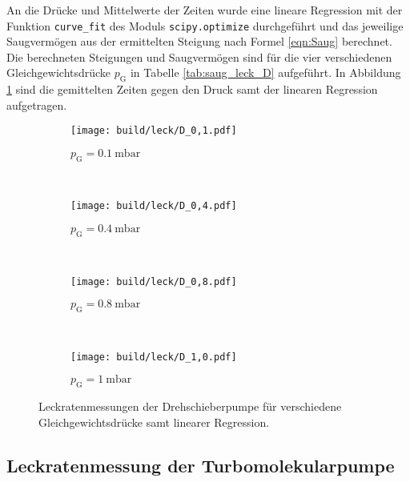 



\FloatBarrier

An die Drücke und Mittelwerte der Zeiten wurde eine
lineare Regression mit der Funktion \texttt{curve\_fit}
des Moduls \texttt{scipy.optimize} durchgeführt
und das jeweilige Saugvermögen aus der ermittelten Steigung nach Formel \eqref{eqn:Saug}
berechnet. Die berechneten Steigungen und Saugvermögen sind für
die vier verschiedenen Gleichgewichtsdrücke $p_\text{G}$
in Tabelle \ref{tab:saug_leck_D} aufgeführt.
In Abbildung \ref{fig:leck_D} sind die gemittelten Zeiten gegen den Druck
samt der linearen Regression aufgetragen.

\begin{figure}
  \centering
  \begin{subfigure}[b]{0.48\textwidth}
    \texttt{[image: build/leck/D\_0,1.pdf]}
    \caption{$p_\text{G} = \SI{0.1}{\milli\bar}$}
  \end{subfigure}
  ~ %
  \begin{subfigure}[b]{0.48\textwidth}
    \texttt{[image: build/leck/D\_0,4.pdf]}
    \caption{$p_\text{G} = \SI{0.4}{\milli\bar}$}
  \end{subfigure}
  \\
  \begin{subfigure}[b]{0.48\textwidth}
    \texttt{[image: build/leck/D\_0,8.pdf]}
    \caption{$p_\text{G} = \SI{0.8}{\milli\bar}$}
  \end{subfigure}
  ~ %
  \begin{subfigure}[b]{0.48\textwidth}
    \texttt{[image: build/leck/D\_1,0.pdf]}
    \caption{$p_\text{G} = \SI{1}{\milli\bar}$}
  \end{subfigure}
  \caption{Leckratenmessungen der Drehschieberpumpe für verschiedene Gleichgewichtsdrücke samt linearer Regression.}
  \label{fig:leck_D}
\end{figure}


\FloatBarrier

\subsection{Leckratenmessung der Turbomolekularpumpe}
\label{sec:AuswLeckT}

